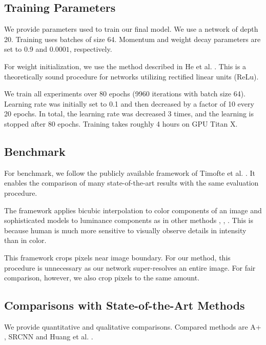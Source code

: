 \documentclass[10pt,twocolumn,letterpaper]{article}
\begin{document}
\subsection{Training Parameters}
We provide parameters used to train our final model. We use a network of depth 20. Training uses batches of size 64. Momentum and weight decay parameters are set to 0.9 and $0.0001$, respectively. 

For weight initialization, we use the method described in He et al. \cite{he2015delving}. This is a theoretically sound procedure for networks utilizing rectified linear units (ReLu).

We train all experiments over 80 epochs (9960 iterations with batch size 64). Learning rate was initially set to 0.1 and then decreased by a factor of 10 every 20 epochs. In total, the learning rate was decreased 3 times, and the learning
is stopped after 80 epochs. Training takes roughly 4 hours on GPU Titan X. 


\subsection{Benchmark}
For benchmark, we follow the publicly available framework of Timofte et al. \cite{Timofte2013}. It enables the comparison of many state-of-the-art results with the same evaluation procedure.

The framework applies bicubic interpolation to color components of an image and sophisticated models to luminance components as in  other methods \cite{chang2004super}, \cite{glasner2009super}, \cite{zeyde2012single}. This is because human is much more sensitive to visually observe details in intensity than in color. 


This framework crops pixels near image boundary. For our method, this procedure is unnecessary as our network super-resolves an entire image. For fair comparison, however, we also crop pixels to the same amount.



\subsection{Comparisons with State-of-the-Art Methods}
We provide quantitative and qualitative comparisons. Compared methods are A+ \cite{Timofte}, SRCNN \cite{Dong2014} and Huang et al. \cite{Huang-CVPR-2015}.
\end{document}
